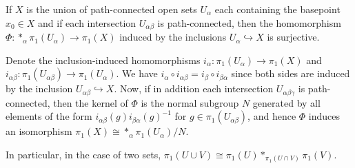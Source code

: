 \begin{thm}\label{thm seifert-van kampen}
    If $X$ is the union of path-connected open sets $U_\alpha$ each containing the basepoint $x_0\in X$ and if each intersection $U_{\alpha\beta}$ is path-connected, then the homomorphism $\varPhi: \ast_\alpha \pi_1(U_\alpha)\to \pi_1(X)$ induced by the inclusions $U_\alpha \hookrightarrow X$ is surjective. 

    Denote the inclusion-induced homomorphisms $i_\alpha:\pi_1(U_\alpha)\to \pi_1(X)$ and $i_{\alpha\beta}:\pi_1(U_{\alpha\beta})\to \pi_1(U_\alpha)$. We have $i_\alpha \circ i_{\alpha\beta}=i_{\beta}\circ i_{\beta\alpha}$ since both sides are induced by the inclusion $U_{\alpha\beta}\hookrightarrow X$. Now, if in addition each intersection $U_{\alpha\beta\gamma}$ is path-connected, then the kernel of $\varPhi$ is the normal subgroup $N$ generated by all elements of the form $i_{\alpha\beta }(g)i_{\beta\alpha}(g)^{-1}$ for $g\in\pi_1(U_{\alpha\beta})$, and hence $\varPhi$ induces an isomorphism $\pi_1(X)\cong \ast_\alpha \pi_1(U_\alpha)/N$.

    In particular, in the case of two sets, $\pi_1(U\cup V)\cong \pi_1(U)\ast_{\pi_1(U\cap V)}\pi_1(V)$.
\end{thm}
